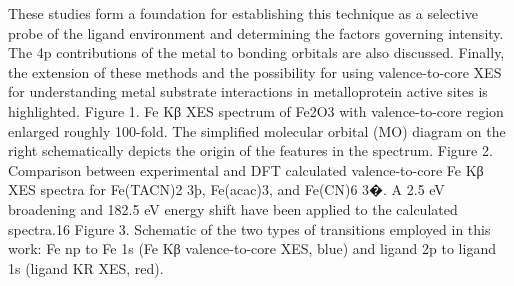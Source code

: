 These studies form a foundation for establishing this technique as
a selective probe of the ligand environment and determining the
factors governing intensity. The 4p contributions of the metal to
bonding orbitals are also discussed. Finally, the extension of these
methods and the possibility for using valence-to-core XES for
understanding metal substrate interactions in metalloprotein
active sites is highlighted.
Figure 1. Fe Kβ XES spectrum of Fe2O3 with valence-to-core region
enlarged roughly 100-fold. The simpliﬁed molecular orbital (MO)
diagram on the right schematically depicts the origin of the features in
the spectrum.
Figure 2. Comparison between experimental and DFT calculated valence-to-core Fe Kβ XES spectra for Fe(TACN)2
3þ, Fe(acac)3, and Fe(CN)6
3�. A
2.5 eV broadening and 182.5 eV energy shift have been applied to the calculated spectra.16
Figure 3. Schematic of the two types of transitions employed in this
work: Fe np to Fe 1s (Fe Kβ valence-to-core XES, blue) and ligand 2p to
ligand 1s (ligand KR XES, red).



